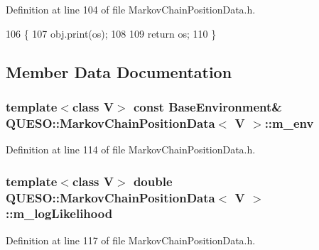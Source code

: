 Definition at line 104 of file Markov\-Chain\-Position\-Data.\-h.


\begin{DoxyCode}
106   \{
107     obj.print(os);
108 
109     \textcolor{keywordflow}{return} os;
110   \}
\end{DoxyCode}


\subsection{Member Data Documentation}
\hypertarget{class_q_u_e_s_o_1_1_markov_chain_position_data_a61841c4f47bd11a7261668bb44e06bd6}{
\subsubsection[{m\-\_\-env}]{\setlength{\rightskip}{0pt plus 5cm}template$<$class V$>$ const {\bf Base\-Environment}\& {\bf Q\-U\-E\-S\-O\-::\-Markov\-Chain\-Position\-Data}$<$ V $>$\-::m\-\_\-env\hspace{0.3cm}{\ttfamily [private]}}}\label{class_q_u_e_s_o_1_1_markov_chain_position_data_a61841c4f47bd11a7261668bb44e06bd6}


Definition at line 114 of file Markov\-Chain\-Position\-Data.\-h.

\hypertarget{class_q_u_e_s_o_1_1_markov_chain_position_data_a2def4815940aee10948cd6575f986010}{
\subsubsection[{m\-\_\-log\-Likelihood}]{\setlength{\rightskip}{0pt plus 5cm}template$<$class V$>$ double {\bf Q\-U\-E\-S\-O\-::\-Markov\-Chain\-Position\-Data}$<$ V $>$\-::m\-\_\-log\-Likelihood\hspace{0.3cm}{\ttfamily [private]}}}\label{class_q_u_e_s_o_1_1_markov_chain_position_data_a2def4815940aee10948cd6575f986010}


Definition at line 117 of file Markov\-Chain\-Position\-Data.\-h.



